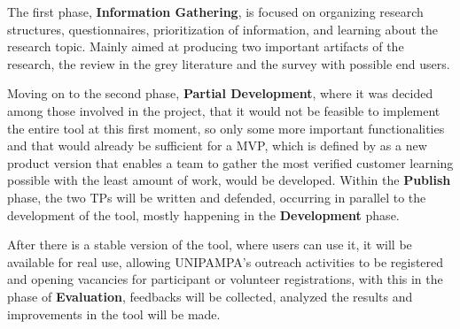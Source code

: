 
The first phase, \textbf{Information Gathering}, is focused on organizing research structures, questionnaires, prioritization of information, and learning about the research topic. Mainly aimed at producing two important artifacts of the research, the review in the grey literature and the survey with possible end users.


Moving on to the second phase, \textbf{Partial Development}, where it was decided among those involved in the project, that it would not be feasible to implement the entire tool at this first moment, so only some more important functionalities and that would already be sufficient for a \ac{MVP}, which is defined by \textcite{ries2011lean} as a new product version that enables a team to gather the most verified customer learning possible with the least amount of work, would be developed.
Within the \textbf{Publish} phase, the two \acp{TP} will be written and defended, occurring in parallel to the development of the tool, mostly happening in the \textbf{Development} phase.


After there is a stable version of the tool, where users can use it, it will be available for real use, allowing UNIPAMPA's outreach activities to be registered and opening vacancies for participant or volunteer registrations, with this in the phase of \textbf{Evaluation}, feedbacks will be collected, analyzed the results and improvements in the tool will be made.

